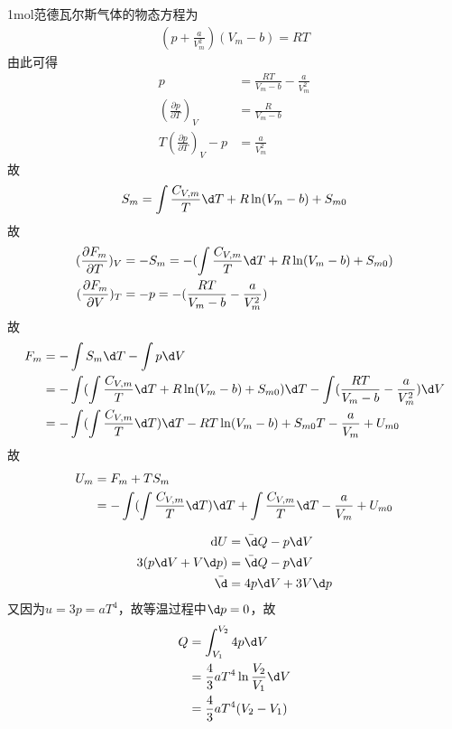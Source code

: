 \documentclass{phyasgn}
\begin{document}
\begin{sol}[7]
    1mol范德瓦尔斯气体的物态方程为
    \begin{align*}
       (p+\frac{a}{V_m^2})(V_m-b)=RT
    \end{align*}
    由此可得
    \begin{align*}
        p&=\frac{RT}{V_m-b}-\frac{a}{V_m^2}\\
        (\frac{\partial p}{\partial T})_V&=\frac{R}{V_m-b}\\
        T(\frac{\partial p}{\partial T})_V-p&=\frac{a}{V_m^2}
    \end{align*}
    故
    \begin{align*}
        S_{m}=\int\frac{C_{V,m}}{T}\d T+R\ln(V_m-b)+S_{m0}
    \end{align*}
    故
    \begin{align*}
        (\frac{\partial F_m}{\partial T})_V&=-S_{m}=-(\int\frac{C_{V,m}}{T}\d T+R\ln(V_m-b)+S_{m0})\\
        (\frac{\partial F_m}{\partial V})_T&=-p=-(\frac{RT}{V_m-b}-\frac{a}{V_m^2})
    \end{align*}
    故
    \begin{align*}
        F_m&=-\int S_{m}\d T-\int p\d V\\
        &=-\int (\int\frac{C_{V,m}}{T}\d T+R\ln(V_m-b)+S_{m0})\d T-\int (\frac{RT}{V_m-b}-\frac{a}{V_m^2})\d V\\
        &=-\int (\int\frac{C_{V,m}}{T}\d T)\d T-RT\ln(V_m-b)+S_{m0}T-\frac{a}{V_m}+U_{m0}
    \end{align*}
    故
    \begin{align*}
        U_m&=F_m+TS_m\\
        &=-\int (\int\frac{C_{V,m}}{T}\d T)\d T+\int\frac{C_{V,m}}{T}\d T-\frac{a}{V_m}+U_{m0}
    \end{align*}
\end{sol}\par

\begin{sol}[8]
    \begin{align*}
        \mathrm{d} U&=\bar{\d} Q-p\d V\\
        3(p\d V+V\d p)&=\bar{\d} Q-p\d V\\
        \bar{\d}&=4p\d V+3V\d p
    \end{align*}
    又因为$u=3p=aT^4$，故等温过程中$\d p=0$，故
    \begin{align*}
        Q&=\int_{V_1}^{V_2}4p\d V\\
        &=\frac{4}{3}aT^4\ln\frac{V_2}{V_1}\d V\\
        &=\frac{4}{3}aT^4(V_2-V_1)
    \end{align*}
\end{sol}\par
\end{document}
